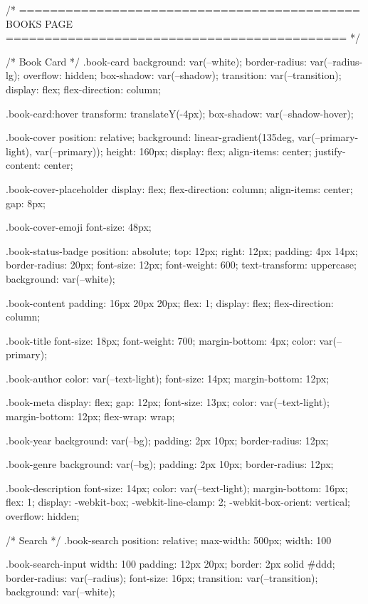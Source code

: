 /* ============================================
   BOOKS PAGE
   ============================================ */

/* Book Card */
.book-card {
  background: var(--white);
  border-radius: var(--radius-lg);
  overflow: hidden;
  box-shadow: var(--shadow);
  transition: var(--transition);
  display: flex;
  flex-direction: column;
}

.book-card:hover {
  transform: translateY(-4px);
  box-shadow: var(--shadow-hover);
}

.book-cover {
  position: relative;
  background: linear-gradient(135deg, var(--primary-light), var(--primary));
  height: 160px;
  display: flex;
  align-items: center;
  justify-content: center;
}

.book-cover-placeholder {
  display: flex;
  flex-direction: column;
  align-items: center;
  gap: 8px;
}

.book-cover-emoji {
  font-size: 48px;
}

.book-status-badge {
  position: absolute;
  top: 12px;
  right: 12px;
  padding: 4px 14px;
  border-radius: 20px;
  font-size: 12px;
  font-weight: 600;
  text-transform: uppercase;
  background: var(--white);
}

.book-content {
  padding: 16px 20px 20px;
  flex: 1;
  display: flex;
  flex-direction: column;
}

.book-title {
  font-size: 18px;
  font-weight: 700;
  margin-bottom: 4px;
  color: var(--primary);
}

.book-author {
  color: var(--text-light);
  font-size: 14px;
  margin-bottom: 12px;
}

.book-meta {
  display: flex;
  gap: 12px;
  font-size: 13px;
  color: var(--text-light);
  margin-bottom: 12px;
  flex-wrap: wrap;
}

.book-year {
  background: var(--bg);
  padding: 2px 10px;
  border-radius: 12px;
}

.book-genre {
  background: var(--bg);
  padding: 2px 10px;
  border-radius: 12px;
}

.book-description {
  font-size: 14px;
  color: var(--text-light);
  margin-bottom: 16px;
  flex: 1;
  display: -webkit-box;
  -webkit-line-clamp: 2;
  -webkit-box-orient: vertical;
  overflow: hidden;
}

/* Search */
.book-search {
  position: relative;
  max-width: 500px;
  width: 100%
}

.book-search-input {
  width: 100%
  padding: 12px 20px;
  border: 2px solid #ddd;
  border-radius: var(--radius);
  font-size: 16px;
  transition: var(--transition);
  background: var(--white);
}

